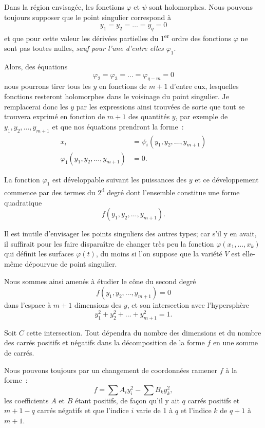 \documentclass{article}
\begin{document}
Dans la région envisagée, les fonctions $\varphi$ et $\psi$ sont holomorphes. Nous pouvons toujours supposer que le point singulier correspond à
\[ y_{1} = y_{2} = \ldots = y_{q} = 0 \]
et que pour cette valeur les dérivées partielles du 1\textsuperscript{er} ordre des fonctions $\varphi$ ne sont pas toutes nulles, \emph{sauf pour l'une d'entre elles $\varphi_{1}$}.

Alors, des équations
\[ \varphi_{2} = \varphi_{3} = \ldots = \varphi_{q-m} = 0 \]
nous pourrons tirer tous les $y$ en fonctions de $m + 1$ d'entre eux, lesquelles fonctions resteront holomorphes dans le voisinage du point singulier. Je remplacerai donc les $y$ par les expressions ainsi trouvées de sorte que tout se trouvera exprimé en fonction de $m + 1$ des quantités $y$, par exemple de $y_{1}, y_{2}, \ldots, y_{m+1}$ et que nos équations prendront la forme~:
\[ \begin{aligned} x_{i} &= \psi_{i}(y_{1}, y_{2}, \ldots, y_{m+1})\\ \varphi_{1}(y_{1}, y_{2}, \ldots, y_{m+1}) &= 0. \end{aligned} \]

La fonction $\varphi_{1}$ est développable suivant les puissances des $y$ et ce développement commence par des termes du 2\textsuperscript{d} degré dont l'ensemble constitue une forme quadratique
\[ f(y_{1}, y_{2}, \ldots, y_{m+1}). \]

Il est inutile d'envisager les points singuliers des autres types; car s'il y en avait, il suffirait pour les faire disparaître de changer très peu la fonction $\varphi(x_{1}, \ldots, x_{k})$ qui définit les surfaces $\varphi(t)$, du moins si l'on suppose que la variété $V$ est elle-même dépourvue de point singulier.

Nous sommes ainsi amenés à étudier le cône du second degré
\[ f(y_{1}, y_{2}, \ldots, y_{m+1}) = 0 \]
dans l'espace à $m + 1$ dimensions des $y$, et son intersection avec l'hypersphère
\[ y^{2}_{1} + y^{2}_{2} + \ldots + y^{2}_{m+1} = 1. \]

Soit $C$ cette intersection. Tout dépendra du nombre des dimensions et du nombre des carrés positifs et négatifs dans la décomposition de la forme $f$ en une somme de carrés.

Nous pouvons toujours par un changement de coordonnées ramener $f$ à la forme~:
\[ f = \sum A_{i} y^{2}_{i} - \sum B_{k} y^{2}_{k}, \]
les coefficients $A$ et $B$ étant positifs, de façon qu'il y ait $q$ carrés positifs et $m + 1 - q$ carrés négatifs et que l'indice $i$ varie de 1 à $q$ et l'indice $k$ de $q + 1$ à $m + 1$.
\end{document}
